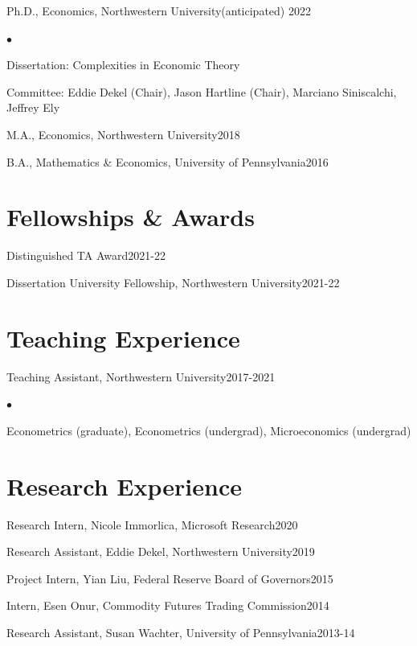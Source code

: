\documentclass[margin,line]{res}
\newenvironment{list1}{
  \begin{list}{\ding{113}}{%
      \setlength{\itemsep}{.025in}
      \setlength{\parsep}{0in} \setlength{\parskip}{0in}
      \setlength{\topsep}{0in} \setlength{\partopsep}{0in}
      \setlength{\leftmargin}{0.17in}}}{\end{list}}
\newenvironment{list2}{
  \begin{list}{$\bullet$}{%
      \setlength{\itemsep}{0in}
      \setlength{\parsep}{0in} \setlength{\parskip}{0in}
      \setlength{\topsep}{0in} \setlength{\partopsep}{0in}
      \setlength{\leftmargin}{0.2in}}}{\end{list}}
\begin{document}
\begin{resume}
\begin{tiny}
\end{tiny}
\begin{list1}
\item[] Ph.D., Economics, Northwestern University\hfill (anticipated) 2022
\item[] \begin{list2}
		\item[] Dissertation: Complexities in Economic Theory
		\item[] Committee: Eddie Dekel (Chair), Jason Hartline (Chair), Marciano Siniscalchi, Jeffrey Ely
	\end{list2}
\item[] M.A., Economics, Northwestern University\hfill 2018
\item[] B.A., Mathematics \& Economics, University of Pennsylvania\hfill 2016
\end{list1}

\section{Fellowships \& Awards}
\begin{list1}
\item[] Distinguished TA Award\hfill 2021-22
\item[] Dissertation University Fellowship, Northwestern University\hfill 2021-22
\end{list1}

\section{Teaching Experience}
\begin{list1}
\item[] Teaching Assistant, Northwestern University\hfill 2017-2021
\item[] \begin{list2}
		\item[] Econometrics (graduate), Econometrics (undergrad), Microeconomics (undergrad)
	\end{list2}
\end{list1}

\section{Research Experience}
\begin{list1}
\item[] Research Intern, Nicole Immorlica, Microsoft Research\hfill 2020
\item[] Research Assistant, Eddie Dekel, Northwestern University\hfill 2019
\item[] Project Intern, Yian Liu, Federal Reserve Board of Governors\hfill 2015
\item[] Intern, Esen Onur, Commodity Futures Trading Commission\hfill 2014
\item[] Research Assistant, Susan Wachter, University of Pennsylvania\hfill 2013-14
\end{list1}


\end{resume}
\end{document}
